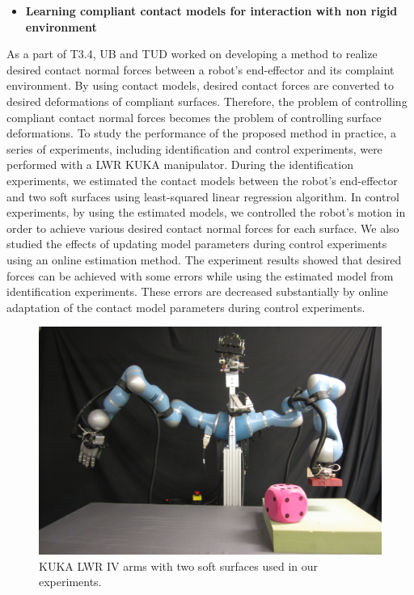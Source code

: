 \begin{itemize}
\item \textbf{Learning compliant contact models for interaction with non rigid environment}
\end{itemize}
As a part of T3.4, UB and TUD worked on developing a method to realize desired
contact normal forces between a robot's end-effector and its complaint
environment.  By using contact models, desired contact forces are converted to
desired deformations of compliant surfaces.  Therefore, the problem of
controlling compliant contact normal forces becomes the problem of controlling
surface deformations.  To study the performance of the proposed method in
practice, a series of experiments, including identification and control
experiments, were performed with a LWR KUKA manipulator.  During the
identification experiments, we estimated the contact models between the
robot's end-effector and two soft surfaces using least-squared linear
regression algorithm.  In control experiments, by using the estimated models,
we controlled the robot's motion in order to achieve various desired contact
normal forces for each surface.  We also studied the effects of updating model
parameters during control experiments using an online estimation method.  The
experiment results showed that desired forces can be achieved with some errors
while using the estimated model from identification experiments.  These errors
are decreased substantially by online adaptation of the contact model
parameters during control experiments.
%
\begin{figure}
  \centering
  \includegraphics[scale=0.1]{images/Boris.jpg}
  \caption{KUKA LWR IV arms with two soft surfaces used in our experiments.}
  \label{Boris}
\end{figure}

